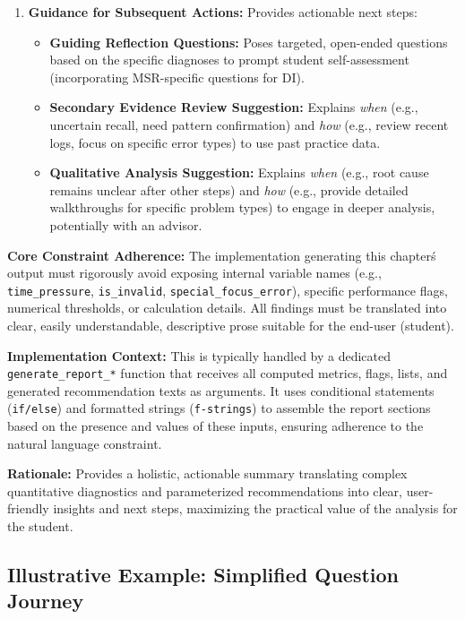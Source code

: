 \documentclass{article}
\begin{document}
\begin{enumerate}
    \item \textbf{Guidance for Subsequent Actions:} Provides actionable next steps:
    \begin{itemize}
        \item \textbf{Guiding Reflection Questions:} Poses targeted, open-ended questions based on the specific diagnoses to prompt student self-assessment (incorporating MSR-specific questions for DI).
        \item \textbf{Secondary Evidence Review Suggestion:} Explains \textit{when} (e.g., uncertain recall, need pattern confirmation) and \textit{how} (e.g., review recent logs, focus on specific error types) to use past practice data.
        \item \textbf{Qualitative Analysis Suggestion:} Explains \textit{when} (e.g., root cause remains unclear after other steps) and \textit{how} (e.g., provide detailed walkthroughs for specific problem types) to engage in deeper analysis, potentially with an advisor.
    \end{itemize}
\end{enumerate}

\textbf{Core Constraint Adherence:} The implementation generating this chapter\'s output must rigorously avoid exposing internal variable names (e.g., \texttt{time\_pressure}, \texttt{is\_invalid}, \texttt{special\_focus\_error}), specific performance flags, numerical thresholds, or calculation details. All findings must be translated into clear, easily understandable, descriptive prose suitable for the end-user (student).

\textbf{Implementation Context:} This is typically handled by a dedicated \texttt{generate\_report\_*} function that receives all computed metrics, flags, lists, and generated recommendation texts as arguments. It uses conditional statements (\texttt{if/else}) and formatted strings (\texttt{f-strings}) to assemble the report sections based on the presence and values of these inputs, ensuring adherence to the natural language constraint.

\textbf{Rationale:} Provides a holistic, actionable summary translating complex quantitative diagnostics and parameterized recommendations into clear, user-friendly insights and next steps, maximizing the practical value of the analysis for the student.

\subsection{Illustrative Example: Simplified Question Journey}
\end{document}
